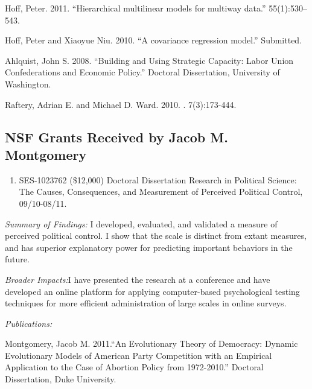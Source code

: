 \documentclass[pdftex,12pt,fullpage,oneside]{amsart}
\begin{document}
\begin{list}{}{\leftmargin=1em}
\item Hoff, Peter. 2011. ``Hierarchical multilinear models for multiway
  data.''  55(1):530--543.

\item Hoff, Peter and Xiaoyue Niu. 2010. ``A covariance regression model.''  Submitted.


\item Ahlquist, John S. 2008. ``Building and Using Strategic Capacity:
  Labor Union Confederations and Economic Policy.''  Doctoral
  Dissertation, University of Washington.

\item  Raftery, Adrian E. and Michael
  D. Ward. 2010. . 7(3):173-444.
\end{list}

 \subsection{NSF Grants Received by Jacob M. Montgomery}
\begin{enumerate}
\item SES-1023762  (\$12,000) Doctoral Dissertation Research in Political Science: The Causes, Consequences, and Measurement of Perceived Political Control, 09/10-08/11.    
\end{enumerate}

\textit{Summary of Findings:} I developed, evaluated, and validated a
measure of perceived political control. I show that the scale is
distinct from extant measures, and has superior explanatory power for
predicting important behaviors in the future. 

\textit{Broader Impacts:}I have presented the research at a
conference and have developed an online platform for applying
computer-based psychological testing techniques for more efficient
administration of large scales in online surveys.

\textit{Publications:}

\begin{list}{}{\leftmargin=1em} \small
\item Montgomery, Jacob M.  2011.``An Evolutionary Theory of Democracy:
  Dynamic Evolutionary Models of American Party Competition with an
  Empirical Application to the Case of Abortion Policy from
  1972-2010.'' Doctoral Dissertation, Duke University.
\end{list}
\end{document}
